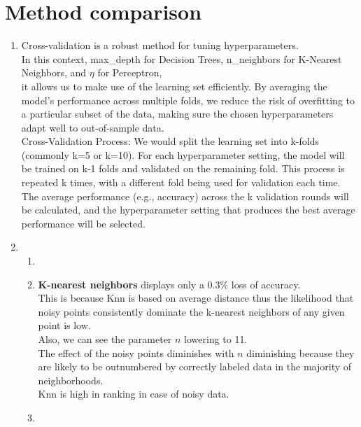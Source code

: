 \documentclass[acmconf,nonacm=true]{acmart}
\begin{document}
\section{Method comparison}
\begin{enumerate}
    \item Cross-validation is a robust method for tuning hyperparameters. \\
     In this context, max\_depth for Decision Trees, n\_neighbors for K-Nearest Neighbors, and $\eta$ for Perceptron,\\
     it allows us to make use of the learning set efficiently.
     By averaging the model's performance across multiple folds, we reduce the risk of overfitting to a particular subset of the data, making sure the chosen hyperparameters adapt well to out-of-sample data.\\
     Cross-Validation Process:
    	We would split the learning set into k-folds (commonly k=5 or k=10).
    	For each hyperparameter setting, the model will be trained on k-1 folds and validated on the remaining fold.
    	This process is repeated k times, with a different fold being used for validation each time.
    	The average performance (e.g., accuracy) across the k validation rounds will be calculated, and the hyperparameter setting that produces the best average performance will be selected.
    \item
\begin{enumerate}
    \item 
    \item \textbf{K-nearest neighbors} displays only a 0.3\% loss of accuracy.\\
    This is because Knn is based on average distance thus the likelihood that noisy points consistently dominate the k-nearest neighbors of any given point is low.\\
    Also, we can see the parameter $n$ lowering to 11.\\
    The effect of the noisy points diminishes with $n$ diminishing because they are likely to be outnumbered by correctly labeled data in the majority of neighborhoods.\\
    Knn is high in ranking in case of noisy data.
    \item 



\end{enumerate}
\end{enumerate}
\end{document}
